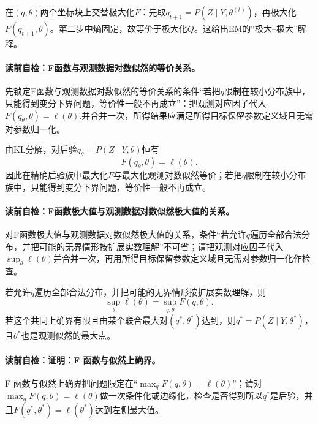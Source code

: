 在$(q,\theta)$两个坐标块上交替极大化$F$：先取$q_{t+1}=P(Z\mid Y,\theta^{(t)})$，再极大化$F(q_{t+1},\theta)$。第二步中熵固定，故等价于极大化$Q$。这给出EM的“极大--极大”解释。

\paragraph{读前自检：F函数与观测数据对数似然的等价关系。}先锁定F函数与观测数据对数似然的等价关系的条件“若把$q$限制在较小分布族中，只能得到变分下界问题，等价性一般不再成立”：把观测对应因子代入$F(q_\theta,\theta)=\ell(\theta).$并合并一次，所得结果应满足所得目标保留参数定义域且无需对参数归一化。\par

由KL分解，对后验$q_\theta=P(Z\mid Y,\theta)$恒有
\[
F(q_\theta,\theta)=\ell(\theta).
\]
因此在精确后验族中最大化$F$与最大化观测对数似然等价；若把$q$限制在较小分布族中，只能得到变分下界问题，等价性一般不再成立。

\paragraph{读前自检：F函数极大值与观测数据对数似然极大值的关系。}对F函数极大值与观测数据对数似然极大值的关系，条件“若允许$q$遍历全部合法分布，并把可能的无界情形按扩展实数理解”不可省；请把观测对应因子代入$\sup_{\theta}\ell(\theta)$并合并一次，再用所得目标保留参数定义域且无需对参数归一化作检查。\par

\begin{theorem}[$F$函数与似然上确界]\label{thm:V3-C04-F-max}
若允许$q$遍历全部合法分布，并把可能的无界情形按扩展实数理解，则
\[
\sup_{\theta}\ell(\theta)=\sup_{q,\theta}F(q,\theta).
\]
若这个共同上确界有限且由某个联合最大对$(q^*,\theta^*)$达到，则$q^*=P(Z\mid Y,\theta^*)$，且$\theta^*$也是观测似然的最大点。
\end{theorem}
\paragraph{读前自检：证明：F 函数与似然上确界。}F 函数与似然上确界把问题限定在“$\max_q F(q,\theta)=\ell(\theta)$”；请对$\max_q F(q,\theta)=\ell(\theta)$做一次条件化或边缘化，检查是否得到所以$q^*$是后验，并且$F(q^*,\theta^*)=\ell(\theta^*)$达到左侧最大值。\par


